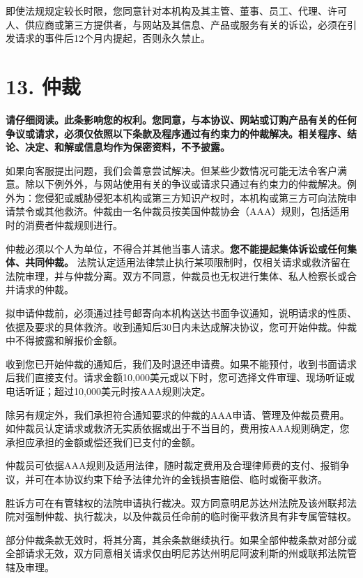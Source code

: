 \documentclass[UTF8,fontset=none,11pt,a4paper]{ctexart}
\begin{document}
即使法规规定较长时限，您同意针对本机构及其主管、董事、员工、代理、许可人、供应商或第三方提供者，与网站及其信息、产品或服务有关的诉讼，必须在引发请求的事件后12个月内提起，否则\allowbreak\mbox{永久禁止。}


\section*{13. 仲裁}
\textbf{请仔细阅读。此条影响您的权利。您同意，与本协议、网站或订购产品有关的任何争议或请求，必须仅依照以下条款及程序通过有约束力的仲裁解决。相关程序、结论、决定、和解或信息均作为保密资料，不予披露。}


如果向客服提出问题，我们会善意尝试解决。但某些少数情况可能无法令客户满意。除以下例外外，与网站使用有关的争议或请求只通过有约束力的仲裁解决。例外为：您侵犯或威胁侵犯本机构或第三方知识产权时，本机构或第三方可向法院申请禁令或其他救济。仲裁由一名仲裁员按美国仲裁协会（AAA）规则，包括适用时的消费者仲裁\allowbreak\mbox{规则进行。}


仲裁必须以个人为单位，不得合并其他当事人请求。\textbf{您不能提起集体诉讼或任何集体、共同仲裁。} 法院认定适用法律禁止执行某项限制时，仅相关请求或救济留在法院审理，并与仲裁分离。双方不同意，仲裁员也无权进行集体、私人检察长或合并请\allowbreak\mbox{求的仲裁。}


拟申请仲裁前，必须通过挂号邮寄向本机构送达书面争议通知，说明请求的性质、依据及要求的具体救济。收到通知后30日内未达成解决协议，您可开始仲裁。仲裁中不得披露和解\allowbreak\mbox{报价金额。}


收到您已开始仲裁的通知后，我们及时退还申请费。如果不能预付，收到书面请求后我们直接支付。请求金额10,000美元或以下时，您可选择文件审理、现场听证或电话听证；超过10,000美元时按AAA\allowbreak\mbox{规则决定。}


除另有规定外，我们承担符合通知要求的仲裁的AAA申请、管理及仲裁员费用。如仲裁员认定请求或救济无实质依据或出于不当目的，费用按AAA规则确定，您承担应承担的金额或偿还我们已支\allowbreak\mbox{付的金额。}


仲裁员可依据AAA规则及适用法律，随时裁定费用及合理律师费的支付、报销争议，并可在本协议约束下给予法律允许的金钱损害赔偿、临时或\allowbreak\mbox{衡平救济。}


胜诉方可在有管辖权的法院申请执行裁决。双方同意明尼苏达州法院及该州联邦法院对强制仲裁、执行裁决，以及仲裁员任命前的临时衡平救济具有非专\allowbreak\mbox{属管辖权。}


部分仲裁条款无效时，将其分离，其余条款继续执行。如果全部仲裁条款对部分或全部请求无效，双方同意相关请求仅由明尼苏达州明尼阿波利斯的州或联邦法院管\allowbreak\mbox{辖及审理。}
\end{document}
